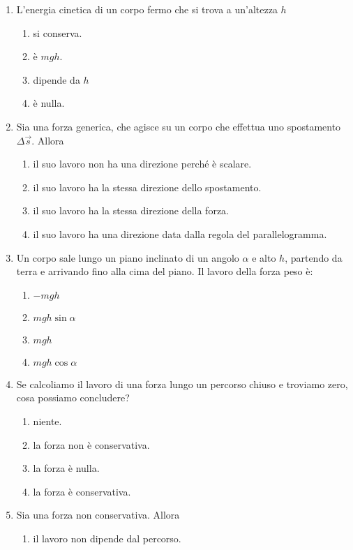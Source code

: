 \documentclass{article}
\begin{document}
\begin{enumerate}
\begin{enumerate}[label=\Alph*.]
  \end{enumerate}
  \item L'energia cinetica di un corpo fermo che si trova a un'altezza $h$
  \begin{enumerate}[label=\Alph*.]
    \item si conserva.
    \item è $mgh$.
    \item dipende da $h$
    \item è nulla.
  \end{enumerate}
  \item Sia  una forza generica, che agisce su un corpo che effettua uno spostamento $\Delta \vec{s}$. Allora
  \begin{enumerate}[label=\Alph*.]
    \item il suo lavoro non ha una direzione perché è scalare.
    \item il suo lavoro ha la stessa direzione dello spostamento.
    \item il suo lavoro ha la stessa direzione della forza.
    \item il suo lavoro ha una direzione data dalla regola del parallelogramma.
  \end{enumerate}
  \item Un corpo sale lungo un piano inclinato di un angolo $\alpha$ e alto $h$, partendo da terra e arrivando fino alla cima del piano. Il lavoro della forza peso è:
  \begin{enumerate}[label=\Alph*.]
    \item $-mgh$
    \item $mgh\sin\alpha$
    \item $mgh$
    \item $mgh\cos\alpha$
  \end{enumerate}
  \item Se calcoliamo il lavoro di una forza lungo un percorso chiuso e troviamo zero, cosa possiamo concludere?
  \begin{enumerate}[label=\Alph*.]
    \item niente.
    \item la forza non è conservativa.
    \item la forza è nulla.
    \item la forza è conservativa.
  \end{enumerate}
  \item Sia  una forza non conservativa. Allora
  \begin{enumerate}[label=\Alph*.]
    \item il lavoro non dipende dal percorso.

\end{enumerate}
\end{enumerate}
\end{document}
